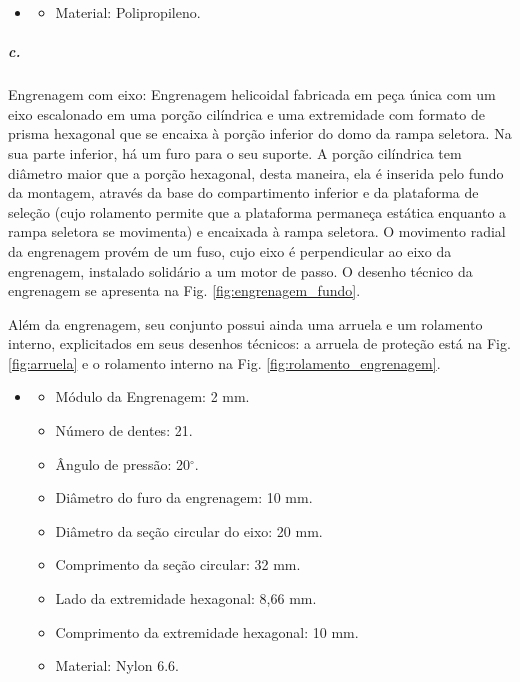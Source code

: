     \begin{itemize}
   \item[]
   \begin{itemize}
       \item  Material: Polipropileno.
   \end{itemize}
   \end{itemize}
   
    
    \subparagraph*{c.} \label{retorno_engrenagem_fundo}
    Engrenagem com eixo: Engrenagem helicoidal fabricada em peça única com um eixo escalonado em uma porção cilíndrica e uma extremidade com formato de prisma hexagonal que se encaixa à porção inferior do domo da rampa seletora. Na sua parte inferior, há um furo para o seu suporte.
    A porção cilíndrica tem diâmetro maior que a porção hexagonal, desta maneira, ela é inserida pelo fundo da montagem, através da base do compartimento inferior e da plataforma de seleção (cujo rolamento permite que a plataforma permaneça estática enquanto a rampa seletora se movimenta) e encaixada à rampa seletora. O movimento radial da engrenagem provém de um fuso, cujo eixo é perpendicular ao eixo da engrenagem, instalado solidário a um motor de passo. O desenho técnico da engrenagem se apresenta na Fig. \ref{fig:engrenagem_fundo}.
    
    
    Além da engrenagem, seu conjunto possui ainda uma arruela e um rolamento interno, explicitados em seus desenhos técnicos: a arruela de proteção está na Fig. \ref{fig:arruela} e o rolamento interno na Fig. \ref{fig:rolamento_engrenagem}.
    
     \begin{itemize}
   \item[]
   \begin{itemize}
        \item Módulo da Engrenagem: 2 mm.
        \item Número de dentes: 21.
        \item Ângulo de pressão: 20$^{\circ}$.
        \item Diâmetro do furo da engrenagem: 10 mm.
        \item Diâmetro da seção circular do eixo: 20 mm.
        \item Comprimento da seção circular: 32 mm.
        \item Lado da extremidade hexagonal: 8,66 mm.
        \item Comprimento da extremidade hexagonal: 10 mm.
        \item Material: Nylon 6.6.
   \end{itemize}
   \end{itemize}
   
